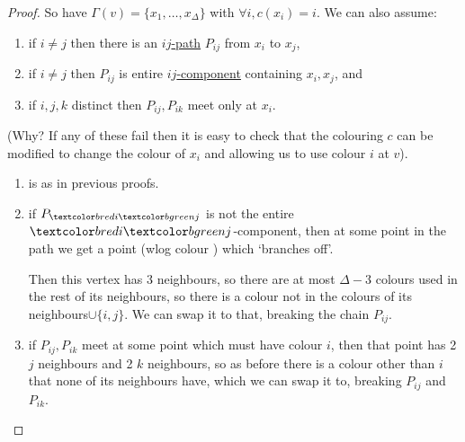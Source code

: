 \documentclass{article}
\begin{document}
\begin{proof}
    So have $\Gamma(v) = \{x_1, \dotsc, x_\Delta\}$ with $\forall i, c(x_i) = i$.
    We can also assume:
    \begin{enumerate}[label=(\roman*)]
        \item if $i \neq j$ then there is an \hyperlink{def:ijpath}{$ij$-path} $P_{ij}$ from $x_i$ to $x_j$,
        \item if $i \neq j$ then $P_{ij}$ is entire \hyperlink{def:ijcomp}{$ij$-component} containing $x_i,x_j$, and
        \item if $i, j, k$ distinct then $P_{ij}, P_{ik}$ meet only at $x_i$.
    \end{enumerate}
    (Why? If any of these fail then it is easy to check that the colouring $c$ can be modified to change the colour of $x_i$ and allowing us to use colour $i$ at $v$).
    \begin{enumerate}[label=(\roman*)]
        \item is as in previous proofs.
        \item if $P_{\red{i}\green{j}}$ is not the entire $\red{i}\green{j}$-component, then
            at some point in the path we get a point (wlog colour ) which `branches off'.
            \begin{center}
            \end{center}
            Then this vertex has 3  neighbours, so there are at most $\Delta - 3$ colours used in the rest of its neighbours, so there is a colour not in the colours of its neighbours$\cup \{i,j\}$.
            We can swap it to that, breaking the chain $P_{ij}$.
        \item if $P_{ij}, P_{ik}$ meet at some point which must have colour $i$, then that point has 2 $j$ neighbours and 2 $k$ neighbours, so as before there is a colour other than $i$ that none of its neighbours have, which we can swap it to, breaking $P_{ij}$ and $P_{ik}$.
    \end{enumerate}


\end{proof}
\end{document}
